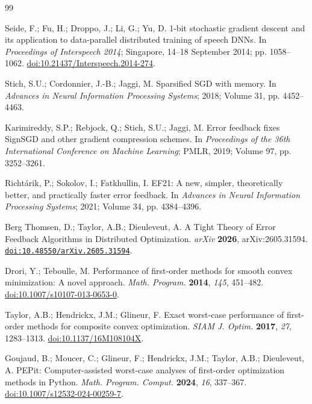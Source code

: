 \begin{thebibliography}{99}

Seide, F.; Fu, H.; Droppo, J.; Li, G.; Yu, D.
1-bit stochastic gradient descent and its application to data-parallel distributed training of speech DNNs.
In \emph{Proceedings of Interspeech 2014};
Singapore, 14--18 September 2014;
pp. 1058--1062.
\href{https://doi.org/10.21437/Interspeech.2014-274}
{doi:10.21437/Interspeech.2014-274}.

Stich, S.U.; Cordonnier, J.-B.; Jaggi, M.
Sparsified SGD with memory.
In \emph{Advances in Neural Information Processing Systems};
2018; Volume 31, pp. 4452--4463.

Karimireddy, S.P.; Rebjock, Q.; Stich, S.U.; Jaggi, M.
Error feedback fixes SignSGD and other gradient compression schemes.
In \emph{Proceedings of the 36th International Conference on Machine Learning};
PMLR, 2019; Volume 97, pp. 3252--3261.

Richt\'arik, P.; Sokolov, I.; Fatkhullin, I.
EF21: A new, simpler, theoretically better, and practically faster error feedback.
In \emph{Advances in Neural Information Processing Systems};
2021; Volume 34, pp. 4384--4396.

Berg Thomsen, D.; Taylor, A.B.; Dieuleveut, A.
A Tight Theory of Error Feedback Algorithms in Distributed Optimization.
\emph{arXiv} \textbf{2026}, arXiv:2605.31594.
\href{https://doi.org/10.48550/arXiv.2605.31594}
{\nolinkurl{doi:10.48550/arXiv.2605.31594}}.

Drori, Y.; Teboulle, M.
Performance of first-order methods for smooth convex minimization: A novel approach.
\emph{Math. Program.} \textbf{2014}, \emph{145}, 451--482.
\href{https://doi.org/10.1007/s10107-013-0653-0}
{doi:10.1007/s10107-013-0653-0}.

Taylor, A.B.; Hendrickx, J.M.; Glineur, F.
Exact worst-case performance of first-order methods for composite convex optimization.
\emph{SIAM J. Optim.} \textbf{2017}, \emph{27}, 1283--1313.
\href{https://doi.org/10.1137/16M108104X}
{doi:10.1137/16M108104X}.

Goujaud, B.; Moucer, C.; Glineur, F.; Hendrickx, J.M.; Taylor, A.B.; Dieuleveut, A.
PEPit: Computer-assisted worst-case analyses of first-order optimization methods in Python.
\emph{Math. Program. Comput.} \textbf{2024}, \emph{16}, 337--367.
\href{https://doi.org/10.1007/s12532-024-00259-7}
{doi:10.1007/s12532-024-00259-7}.


\end{thebibliography}
